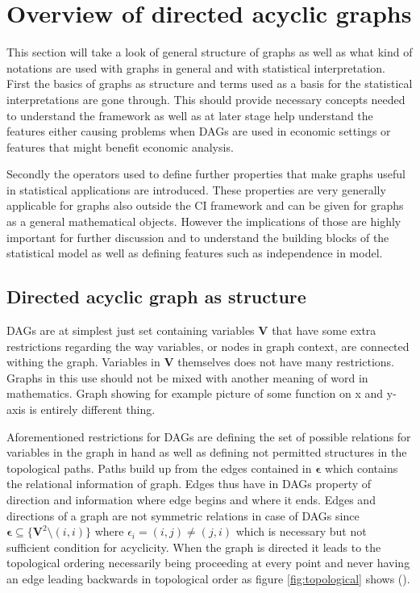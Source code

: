 \documentclass[main=english,12pt,a4paper,pdftex,econ,utf8]{aaltothesis}
\newcommand{\e}{\bm{\epsilon}}
\newcommand{\vars}{\bm{V}}
\begin{document}
\clearpage

\section{Overview of directed acyclic graphs} \label{section:overview}

This section will take a look of general structure of graphs as well as what kind of notations are used with graphs in general and with statistical interpretation. First the basics of graphs as structure and terms used as a basis for the statistical interpretations are gone through. This should provide necessary concepts needed to understand the framework as well as at later stage help understand the features either causing problems when DAGs are used in economic settings or features that might benefit economic analysis.

Secondly the operators used to define further properties that make graphs useful in statistical applications are introduced. These properties are very generally applicable for graphs also outside the CI framework and can be given for graphs as a general mathematical objects. However the implications of those are highly important for further discussion and to understand the building blocks of the statistical model as well as defining features such as independence in model.

\subsection{Directed acyclic graph as structure}

DAGs are at simplest just set containing variables $\vars$ that have some extra restrictions regarding the way variables, or nodes in graph context, are connected withing the graph. Variables in $\vars$ themselves does not have many restrictions. Graphs in this use should not be mixed with another meaning of word in mathematics. Graph showing for example picture of some function on x and y-axis is entirely different thing.

Aforementioned restrictions for DAGs are defining the set of possible relations for variables in the graph in hand as well as defining not permitted structures in the topological paths. Paths build up from the edges contained in $\e$ which contains the relational information of graph. Edges thus have in DAGs property of direction and information where edge begins and where it ends. Edges and directions of a graph are not symmetric relations in case of DAGs since $\e\subseteq \{\vars^2\setminus(i,i)\}$ where $\epsilon_i=(i,j)\neq(j,i)$ which is necessary but not sufficient condition for acyclicity. When the graph is directed it leads to the topological ordering necessarily being proceeding at every point and never having an edge leading backwards in topological order as figure \ref{fig:topological} shows (\cite{Peters2017}).
\end{document}
